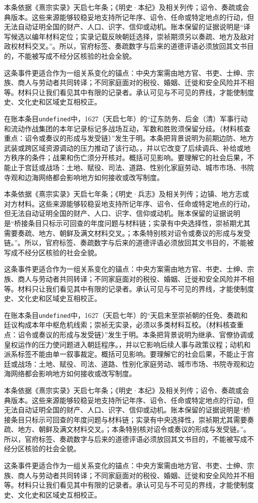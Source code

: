 本条依据《熹宗实录》天启七年条；《明史·本纪》及相关列传；诏令、奏疏或会典版本。这些来源能够较稳妥地支持所记年序、诏令、任命或特定地点的行动，但无法自动证明全国的财产、人口、识字、信仰或动机。账本保留的证据说明是“译写候选以编年材料定位；实录记载反映朝廷选择，崇祯期须另以奏疏、地方及敌对政权材料交叉。”。所以，官府标签、奏疏数字与后来的道德评语必须放回其文书目的，不能被写成不经分区核验的社会全貌。

这条事件更适合作为一组关系变化的锚点：中央方案需由地方官、书吏、士绅、宗族、商人与劳动者共同转译；不同家庭面对的税役、婚姻、迁徙和安全风险并不相等。材料只让我们看见其中有限的记录者。承认可见与不可见的界线，才能使制度史、文化史和区域史互相校正。

在账本条目\texttt{undefined}中，1627（天启七年）的“辽东防务、后金（清）军事行动和流动作战集团的本年记录标记多战场互动，军数和胜败须保留分歧。（材料核查重点：诏令或奏议的形成与发受链）”发生于明。本条把背景说明为前期边防、地方武装或跨区域资源调动的压力推动了该行动。，并以它改变了后续调兵、补给或地方秩序的条件；战果和伤亡须分开核对。概括可见影响。要理解它的社会后果，不能止于宫廷或战场：土地、赋役、司法、道路、性别化家庭劳动、城市市场、书院寺观和边海网络都会影响地方如何接收或改写制度。

本条依据《熹宗实录》天启七年条；《明史·兵志》及相关列传；边镇、地方志或对方材料。这些来源能够较稳妥地支持所记年序、诏令、任命或特定地点的行动，但无法自动证明全国的财产、人口、识字、信仰或动机。账本保留的证据说明是“桥接条目只标示可回查的年度问题与材料链；实录有中央选择性，崇祯期尤其需要奏疏、地方、朝鲜及满文材料交叉。；本条特别核对诏令或奏议的形成与发受链。”。所以，官府标签、奏疏数字与后来的道德评语必须放回其文书目的，不能被写成不经分区核验的社会全貌。

这条事件更适合作为一组关系变化的锚点：中央方案需由地方官、书吏、士绅、宗族、商人与劳动者共同转译；不同家庭面对的税役、婚姻、迁徙和安全风险并不相等。材料只让我们看见其中有限的记录者。承认可见与不可见的界线，才能使制度史、文化史和区域史互相校正。

在账本条目\texttt{undefined}中，1627（天启七年）的“天启末至崇祯朝的任免、奏疏和廷议构成本年中枢危机线索；崇祯无实录，必须以多类材料互校。（材料核查重点：诏令或奏议的形成与发受链）”发生于明。本条把背景说明为继承、官僚协调或皇权运作的压力使问题进入朝廷程序。，并以它影响后续人事与政策议程；动机和派系标签不能由单一叙事裁定。概括可见影响。要理解它的社会后果，不能止于宫廷或战场：土地、赋役、司法、道路、性别化家庭劳动、城市市场、书院寺观和边海网络都会影响地方如何接收或改写制度。

本条依据《熹宗实录》天启七年条；《明史·本纪》及相关列传；诏令、奏疏或会典版本。这些来源能够较稳妥地支持所记年序、诏令、任命或特定地点的行动，但无法自动证明全国的财产、人口、识字、信仰或动机。账本保留的证据说明是“桥接条目只标示可回查的年度问题与材料链；实录有中央选择性，崇祯期尤其需要奏疏、地方、朝鲜及满文材料交叉。；本条特别核对诏令或奏议的形成与发受链。”。所以，官府标签、奏疏数字与后来的道德评语必须放回其文书目的，不能被写成不经分区核验的社会全貌。

这条事件更适合作为一组关系变化的锚点：中央方案需由地方官、书吏、士绅、宗族、商人与劳动者共同转译；不同家庭面对的税役、婚姻、迁徙和安全风险并不相等。材料只让我们看见其中有限的记录者。承认可见与不可见的界线，才能使制度史、文化史和区域史互相校正。
